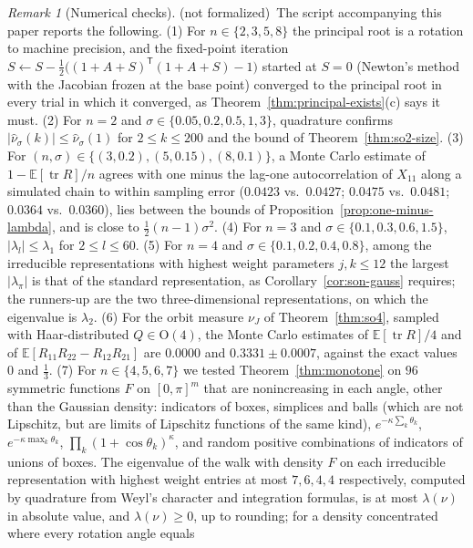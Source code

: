 \documentclass[11pt]{amsart}
\theoremstyle{definition}
\theoremstyle{remark}
\newtheorem{remark}[theorem]{Remark}
\newcommand{\notformal}{\textup{(not formalized)}}
\newcommand{\E}{\mathbb{E}}
\newcommand{\Or}{\mathrm{O}}
\newcommand{\tr}{\operatorname{tr}}
\newcommand{\transp}{^{\mathsf T}}
\begin{document}
\begin{remark}[Numerical checks]\label{rem:numerics}
\notformal\ The script  accompanying this paper reports the following.
(1) For $n\in\{2,3,5,8\}$ the principal root is a rotation to machine precision, and the
fixed-point iteration $S\leftarrow S-\tfrac12\bigl((1+A+S)\transp(1+A+S)-1\bigr)$ started at
$S=0$ (Newton's method with the Jacobian frozen at the base point) converged to the principal
root in every trial in which it converged, as Theorem~\ref{thm:principal-exists}(c) says it
must.
(2) For $n=2$ and $\sigma\in\{0.05,0.2,0.5,1,3\}$, quadrature confirms
$|\hat\nu_\sigma(k)|\le\hat\nu_\sigma(1)$ for $2\le k\le200$ and the bound of
Theorem~\ref{thm:so2-size}.
(3) For $(n,\sigma)\in\{(3,0.2),(5,0.15),(8,0.1)\}$, a Monte Carlo estimate of
$1-\E[\tr R]/n$ agrees with one minus the lag-one autocorrelation of $X_{11}$ along a simulated
chain to within sampling error ($0.0423$ vs.\ $0.0427$; $0.0475$ vs.\ $0.0481$; $0.0364$
vs.\ $0.0360$), lies between the bounds of Proposition~\ref{prop:one-minus-lambda}, and is
close to $\tfrac12(n-1)\sigma^2$.
(4) For $n=3$ and $\sigma\in\{0.1,0.3,0.6,1.5\}$, $|\lambda_l|\le\lambda_1$ for $2\le l\le60$.
(5) For $n=4$ and $\sigma\in\{0.1,0.2,0.4,0.8\}$, among the irreducible representations with
highest weight parameters $j,k\le12$ the largest $|\lambda_\pi|$ is that of the standard
representation, as Corollary~\ref{cor:son-gauss} requires; the runners-up are the two
three-dimensional representations, on which the eigenvalue is $\lambda_2$.
(6) For the orbit measure $\nu_J$ of Theorem~\ref{thm:so4}, sampled with Haar-distributed
$Q\in\Or(4)$, the Monte Carlo estimates of $\E[\tr R]/4$ and of $\E[R_{11}R_{22}-R_{12}R_{21}]$
are $0.0000$ and $0.3331\pm0.0007$, against the exact values $0$ and $\tfrac13$.
(7) For $n\in\{4,5,6,7\}$ we tested Theorem~\ref{thm:monotone} on $96$ symmetric functions $F$ on
$[0,\pi]^m$ that are nonincreasing in each angle, other than the Gaussian density: indicators of
boxes, simplices and balls (which are not Lipschitz, but are limits of Lipschitz functions of the
same kind), $e^{-\kappa\sum_k\theta_k}$, $e^{-\kappa\max_k\theta_k}$,
$\prod_k(1+\cos\theta_k)^\kappa$, and random positive combinations of indicators of unions of
boxes.  The eigenvalue of the walk with density $F$ on each irreducible representation with
highest weight entries at most $7,6,4,4$ respectively, computed by quadrature from Weyl's
character and integration formulas, is at most $\lambda(\nu)$ in absolute value, and
$\lambda(\nu)\ge0$, up to rounding; for a density concentrated where every rotation angle equals

\end{remark}
\end{document}
